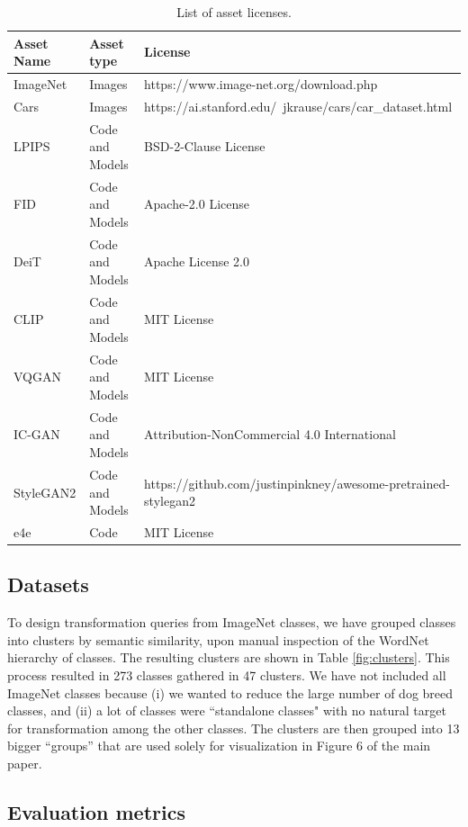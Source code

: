 \begin{table}
\center
\begin{tabular}{lll}
\toprule
\textbf{Asset Name} & \textbf{Asset type} & \textbf{License} \\
\midrule
ImageNet & Images & https://www.image-net.org/download.php \\
Cars & Images & https://ai.stanford.edu/~jkrause/cars/car\_dataset.html\\
LPIPS & Code and Models & BSD-2-Clause License \\
FID & Code and Models & Apache-2.0 License \\
DeiT & Code and Models & Apache License 2.0 \\
CLIP & Code and Models & MIT License \\
VQGAN & Code and Models & MIT License \\
IC-GAN & Code and Models & Attribution-NonCommercial 4.0 International \\
StyleGAN2 & Code and Models & https://github.com/justinpinkney/awesome-pretrained-stylegan2 \\
e4e & Code &  MIT License \\
\bottomrule
\end{tabular}
\caption{List of asset licenses.}
\label{tab:licences}
\end{table}

\subsection{Datasets}
\label{appendix.datasets}

To design transformation queries from ImageNet classes, we have grouped classes 
into clusters by semantic similarity, upon manual inspection of the WordNet hierarchy
 of classes. 
The resulting clusters are shown in Table \ref{fig:clusters}. This process resulted
in 273 classes gathered in 47 clusters. We have not included all ImageNet classes 
because (i) we wanted to reduce the large number of dog breed classes, and (ii) a 
lot of classes were ``standalone classes" with no natural target for transformation 
among the other classes. The clusters are then grouped into 13 bigger ``groups'' that 
are used solely for visualization in Figure 6 %
 of the main paper.


\subsection{Evaluation metrics}

